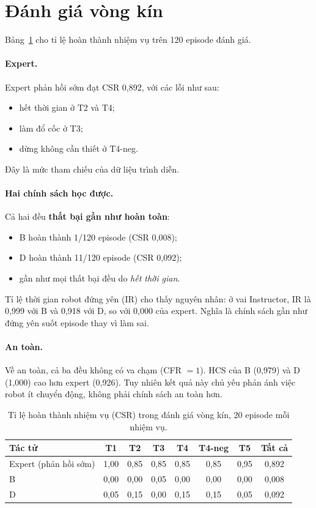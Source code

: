 \section{Đánh giá vòng kín}
\label{sec:closed-loop-results}

Bảng~\ref{tab:closed-loop} cho tỉ lệ hoàn thành nhiệm vụ trên 120 episode đánh giá.

\paragraph{Expert.} Expert phản hồi sớm đạt CSR 0,892, với các lỗi như sau:
\begin{itemize}
  \item hết thời gian ở T2 và T4;
  \item làm đổ cốc ở T3;
  \item dừng không cần thiết ở T4-neg.
\end{itemize}
Đây là mức tham chiếu của dữ liệu trình diễn.

\paragraph{Hai chính sách học được.} Cả hai đều \textbf{thất bại gần như hoàn toàn}:
\begin{itemize}
  \item B hoàn thành 1/120 episode (CSR 0,008);
  \item D hoàn thành 11/120 episode (CSR 0,092);
  \item gần như mọi thất bại đều do \emph{hết thời gian}.
\end{itemize}
Tỉ lệ thời gian robot đứng yên (IR) cho thấy nguyên nhân: ở vai Instructor, IR là 0,999 với B và 0,918 với D, so với 0,000 của expert. Nghĩa là chính sách gần như đứng yên suốt episode thay vì làm sai.

\paragraph{An toàn.} Về an toàn, cả ba đều không có va chạm (CFR $= 1$). HCS của B (0,979) và D (1,000) cao hơn expert (0,926). Tuy nhiên kết quả này chủ yếu phản ánh việc robot ít chuyển động, không phải chính sách an toàn hơn.

\begin{table}[htbp]
  \centering
  \caption{Tỉ lệ hoàn thành nhiệm vụ (CSR) trong đánh giá vòng kín, 20 episode mỗi nhiệm vụ.}
  \label{tab:closed-loop}
  \begin{tabular}{@{}lccccccc@{}}
    \toprule
    \textbf{Tác tử} & \textbf{T1} & \textbf{T2} & \textbf{T3} & \textbf{T4} & \textbf{T4-neg} & \textbf{T5} & \textbf{Tất cả} \\
    \midrule
    Expert (phản hồi sớm) & 1,00 & 0,85 & 0,85 & 0,85 & 0,85 & 0,95 & 0,892 \\
    B                     & 0,00 & 0,00 & 0,05 & 0,00 & 0,00 & 0,00 & 0,008 \\
    D                     & 0,05 & 0,15 & 0,00 & 0,15 & 0,15 & 0,05 & 0,092 \\
    \bottomrule
  \end{tabular}
\end{table}

